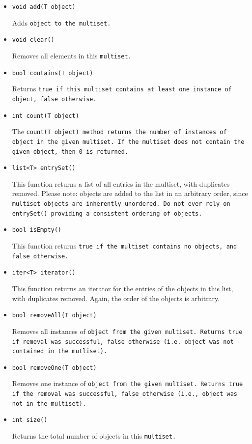 \documentclass{article}
\begin{document}
\begin{itemize}

\item[] \tt void add(T object) \rm

Adds \tt object \rm to the \tt multiset\rm.

\item[] \tt void clear() \rm

Removes all elements in this \tt multiset\rm.

\item[] \tt bool contains(T object) \rm

Returns \tt true \rm if this \tt multiset \rm contains at least one instance of
\tt object\rm, \tt false \rm otherwise.

\item[] \tt int count(T object) \rm

The \tt count(T object) \rm method returns the number of instances of \tt object \rm
in the given \tt multiset\rm. If the \tt multiset \rm does not contain the given
object, then \tt 0 \rm is returned. 

\item[] \tt list<T> entrySet() \rm

This function returns a list of all entries in the multiset, with duplicates removed.
Please note: objects are added to the list in an arbitrary order, since \tt multiset
\rm objects are inherently unordered. Do not ever rely on \tt entrySet() \rm 
providing a consistent ordering of objects.

\item[] \tt bool isEmpty() \rm

This function returns \tt true \rm if the \tt multiset \rm contains no objects, and
\tt false \rm otherwise.

\item[] \tt iter<T> iterator() \rm

This function returns an iterator for the entries of the objects in this list,
with duplicates removed. Again, the order of the objects is arbitrary. 

\item[] \tt bool removeAll(T object) \rm

Removes all instances of \tt object \rm from the given \tt multiset\rm. Returns
\tt true \rm if removal was successful, \tt false \rm otherwise (i.e. \tt object \rm
was not contained in the \tt mutliset\rm).

\item[] \tt bool removeOne(T object) \rm

Removes one instance of \tt object \rm from the given \tt multiset\rm. Returns
\tt true \rm if the removal was successful, \tt false \rm otherwise (i.e.,
\tt object \rm was not in the \tt multiset\rm).

\item[] \tt int size() \rm

Returns the total number of objects in this \tt multiset\rm.

\end{itemize}
\end{document}
